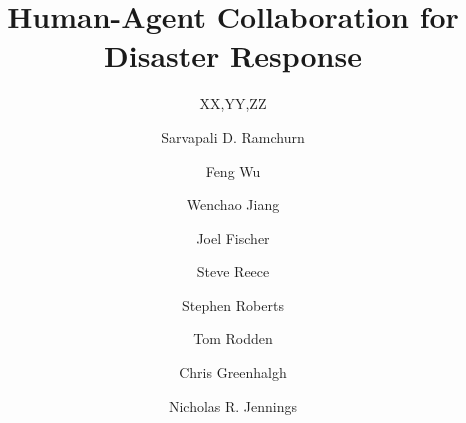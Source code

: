 \documentclass{svjour3}                     %
\begin{document}


\title{Human-Agent Collaboration for Disaster Response}




%
%
%
%

%

%
\author{XX,YY,ZZ}
\author{Sarvapali D. Ramchurn \and Feng Wu \and Wenchao Jiang \and Joel Fischer \and Steve Reece \and Stephen Roberts \and Tom Rodden \and Chris Greenhalgh \and  Nicholas R. Jennings
}

%
\end{document}

